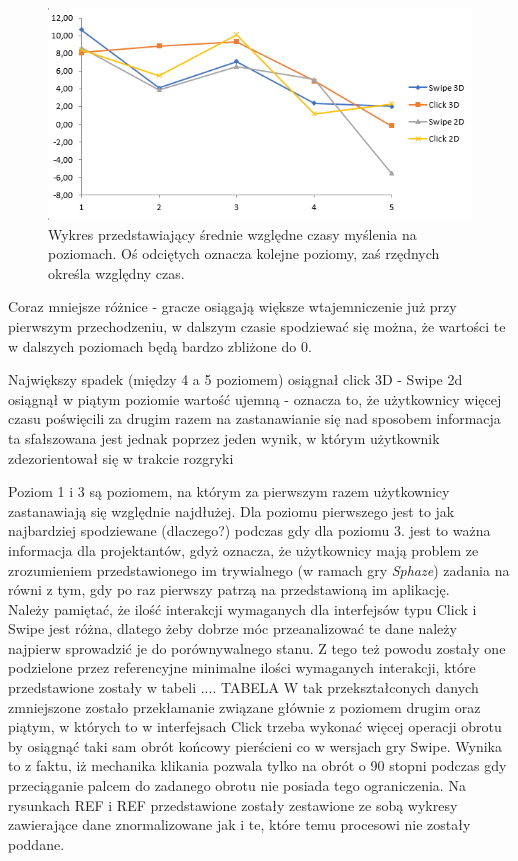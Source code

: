 \documentclass[a4paper,12pt,numbers=noenddot]{report}
\begin{document}
\begin{figure}[h!]
	\centering
  	\includegraphics[width=0.9\linewidth]{diag/rel_mean_thinkTime.png}
	\caption{Wykres przedstawiający średnie względne czasy myślenia na poziomach. Oś odciętych oznacza kolejne poziomy, zaś rzędnych określa względny czas.}
	\label{fig:diag:rel:mean_ThinkTime}
\end{figure}

Coraz mniejsze różnice - gracze osiągają większe wtajemniczenie już przy pierwszym przechodzeniu, w dalszym czasie spodziewać się można, że wartości te w dalszych poziomach będą bardzo zbliżone do 0.

Największy spadek (między 4 a 5 poziomem) osiągnał click 3D - 
Swipe 2d osiągnął w piątym poziomie wartość ujemną - oznacza to, że użytkownicy więcej czasu poświęcili za drugim razem na zastanawianie się nad sposobem informacja ta sfałszowana jest jednak poprzez jeden wynik, w którym użytkownik zdezorientował się w trakcie rozgryki

Poziom 1 i 3 są poziomem, na którym za pierwszym razem użytkownicy zastanawiają się względnie najdłużej. Dla poziomu pierwszego jest to jak najbardziej spodziewane (dlaczego?) podczas gdy dla poziomu 3. jest to ważna informacja dla projektantów, gdyż oznacza, że użytkownicy mają problem ze zrozumieniem przedstawionego im trywialnego (w ramach gry \textit{Sphaze}) zadania na równi z tym, gdy po raz pierwszy patrzą na przedstawioną im aplikację. \\

Należy pamiętać, że ilość interakcji wymaganych dla interfejsów typu Click i Swipe jest różna, dlatego żeby dobrze móc przeanalizować te dane należy najpierw sprowadzić je do porównywalnego stanu. Z tego też powodu zostały one podzielone przez referencyjne minimalne ilości wymaganych interakcji, które przedstawione zostały w tabeli .... 
TABELA
W tak przekształconych danych zmniejszone zostało przekłamanie związane głównie z poziomem drugim oraz piątym, w których to w interfejsach Click trzeba wykonać więcej operacji obrotu by osiągnąć taki sam obrót końcowy pierścieni co w wersjach gry Swipe. Wynika to z faktu, iż mechanika klikania pozwala tylko na obrót o 90 stopni podczas gdy przeciąganie palcem do zadanego obrotu nie posiada tego ograniczenia. Na rysunkach REF i REF przedstawione zostały zestawione ze sobą wykresy zawierające dane znormalizowane jak i te, które temu procesowi nie zostały poddane.
\end{document}
